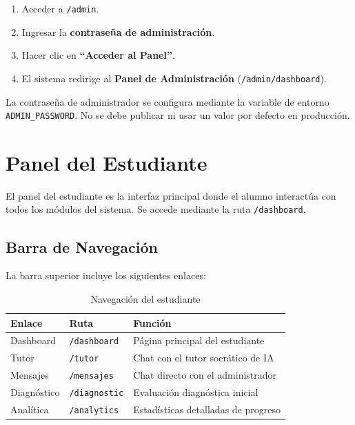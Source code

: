 \documentclass[12pt, a4paper, oneside]{book}
\begin{document}
\begin{stepbox}[title={Acceso al panel de administración}]
\begin{enumerate}
    \item Acceder a \texttt{/admin}.
    \item Ingresar la \textbf{contraseña de administración}.
    \item Hacer clic en \textbf{``Acceder al Panel''}.
    \item El sistema redirige al \textbf{Panel de Administración} (\texttt{/admin/dashboard}).
\end{enumerate}
\end{stepbox}

\begin{importantebox}
    La contraseña de administrador se configura mediante la variable de entorno \texttt{ADMIN\_PASSWORD}. No se debe publicar ni usar un valor por defecto en producción.
\end{importantebox}


\chapter{Panel del Estudiante}

El panel del estudiante es la interfaz principal donde el alumno interactúa con todos los módulos del sistema. Se accede mediante la ruta \texttt{/dashboard}.

\section{Barra de Navegación}

La barra superior incluye los siguientes enlaces:

\begin{table}[H]
\centering
\renewcommand{\arraystretch}{1.3}
\begin{tabularx}{\textwidth}{l l X}
    \toprule
    \textbf{Enlace} & \textbf{Ruta} & \textbf{Función} \\
    \midrule
    Dashboard & \texttt{/dashboard} & Página principal del estudiante \\
    Tutor & \texttt{/tutor} & Chat con el tutor socrático de IA \\
    Mensajes & \texttt{/mensajes} & Chat directo con el administrador \\
    Diagnóstico & \texttt{/diagnostic} & Evaluación diagnóstica inicial \\
    Analítica & \texttt{/analytics} & Estadísticas detalladas de progreso \\
    \bottomrule
\end{tabularx}
\caption{Navegación del estudiante}
\end{table}
\end{document}

